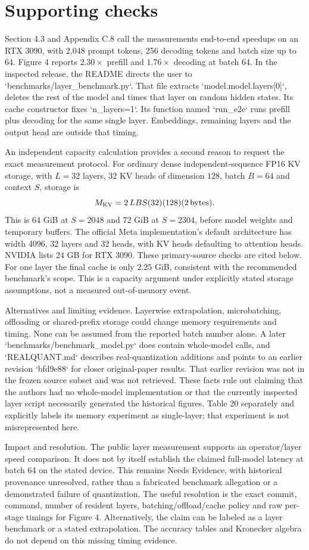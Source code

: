 \documentclass[10pt]{article}
\begin{document}
\section*{Supporting checks}
Section 4.3 and Appendix C.8 call the measurements end-to-end speedups on an RTX 3090, with 2,048 prompt tokens, 256 decoding tokens and batch size up to 64. Figure 4 reports \(2.30\times\) prefill and \(1.76\times\) decoding at batch 64. In the inspected release, the README directs the user to `benchmarks/layer\_benchmark.py`. That file extracts `model.model.layers[0]`, deletes the rest of the model and times that layer on random hidden states. Its cache constructor fixes `n\_layers=1`. Its function named `run\_e2e` runs prefill plus decoding for the same single layer. Embeddings, remaining layers and the output head are outside that timing.\par
An independent capacity calculation provides a second reason to request the exact measurement protocol. For ordinary dense independent-sequence FP16 KV storage, with \(L=32\) layers, \(32\) KV heads of dimension \(128\), batch \(B=64\) and context \(S\), storage is \[M_{\rm KV}=2\,LBS(32)(128)(2\,\text{bytes}).\] This is \(64\) GiB at \(S=2048\) and \(72\) GiB at \(S=2304\), before model weights and temporary buffers. The official Meta implementation’s default architecture has width 4096, 32 layers and 32 heads, with KV heads defaulting to attention heads. NVIDIA lists 24 GB for RTX 3090. These primary-source checks are cited below. For one layer the final cache is only \(2.25\) GiB, consistent with the recommended benchmark’s scope. This is a capacity argument under explicitly stated storage assumptions, not a measured out-of-memory event.\par
Alternatives and limiting evidence. Layerwise extrapolation, microbatching, offloading or shared-prefix storage could change memory requirements and timing. None can be assumed from the reported batch number alone. A later `benchmarks/benchmark\_model.py` does contain whole-model calls, and `REALQUANT.md` describes real-quantization additions and points to an earlier revision `bfd9e88` for closer original-paper results. That earlier revision was not in the frozen source subset and was not retrieved. These facts rule out claiming that the authors had no whole-model implementation or that the currently inspected layer script necessarily generated the historical figures. Table 20 separately and explicitly labels its memory experiment as single-layer; that experiment is not misrepresented here.\par
Impact and resolution. The public layer measurement supports an operator/layer speed comparison. It does not by itself establish the claimed full-model latency at batch 64 on the stated device. This remains Needs Evidence, with historical provenance unresolved, rather than a fabricated benchmark allegation or a demonstrated failure of quantization. The useful resolution is the exact commit, command, number of resident layers, batching/offload/cache policy and raw per-stage timings for Figure 4. Alternatively, the claim can be labeled as a layer benchmark or a stated extrapolation. The accuracy tables and Kronecker algebra do not depend on this missing timing evidence.\par
\end{document}
